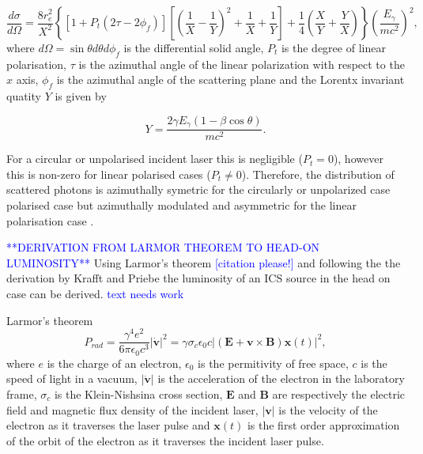 \documentclass[../main.tex]{subfiles}
\begin{document}
\begin{equation}
\frac{d\sigma}{d\Omega} = \frac{8r_{e}^{2}}{X^{2}}\left\{\left[1+P_{t}\left(2\tau-2\phi_{f}\right)\right]\left[\left(\frac{1}{X}-\frac{1}{Y}\right)^{2}+\frac{1}{X}+\frac{1}{Y}\right]+\frac{1}{4}\left(\frac{X}{Y}+\frac{Y}{X}\right)\right\}\left(\frac{E_{\gamma}}{mc^{2}}\right)^{2},    
\end{equation}
where $d\Omega = \sin\theta d\theta d\phi_{f}$ is the differential solid angle, $P_{t}$ is the degree of linear polarisation, $\tau$ is the azimuthal angle of the linear polarization with respect to the $x$ axis, $\phi_{f}$ is the azimuthal angle of the scattering plane and the Lorentx invariant quatity $Y$ is given by

\begin{equation}
Y = \frac{2\gamma E_{\gamma}\left(1-\beta\cos\theta\right)}{mc^{2}}.
\label{eq:cross_section_Y}    
\end{equation}

For a circular or unpolarised incident laser this is negligible ($P_{t}=0$), however this is non-zero for linear polarised cases ($P_{t}\neq0$). Therefore, the distribution of scattered photons is azimuthally symetric for the circularly or unpolarized case polarised case but azimuthally modulated and asymmetric for the linear polarisation case \cite{sun2011theoretical}.  


\textcolor{blue}{**DERIVATION FROM LARMOR THEOREM TO HEAD-ON LUMINOSITY**}
Using Larmor's theorem \textcolor{blue}{[citation please!]} and following the the derivation by Krafft and Priebe \cite{krafft2010compton} the luminosity of an ICS source in the head on case can be derived. \textcolor{blue}{text needs work}

Larmor's theorem
\begin{equation}
P_{rad} = \frac{\gamma^{4}e^{2}}{6\pi \epsilon_{0}c^{3}}\lvert\mathbf{\dot{v}}\rvert^{2} = \gamma\sigma_{c}\epsilon_{0}c\lvert\left(\mathbf{E}+\mathbf{v}\times\mathbf{B}\right)\mathbf{x}\left(t\right)\rvert^{2},
\label{eq:larmor_formula}    
\end{equation}
where $e$ is the charge of an electron,  $\epsilon_{0}$ is the permitivity of free space, $c$ is the speed of light in a vacuum, $\lvert\mathbf{\dot{v}}\rvert$ is the acceleration of the electron in the laboratory frame, $\sigma_{c}$ is the Klein-Nishsina cross section, $\mathbf{E}$ and $\mathbf{B}$ are respectively the electric field and magnetic flux density of the incident laser, $\lvert\mathbf{v}\rvert$ is the velocity of the electron as it traverses the laser pulse and $\mathbf{x}\left(t\right)$ is the first order approximation of the orbit of the electron as it traverses the incident laser pulse. 
\end{document}
